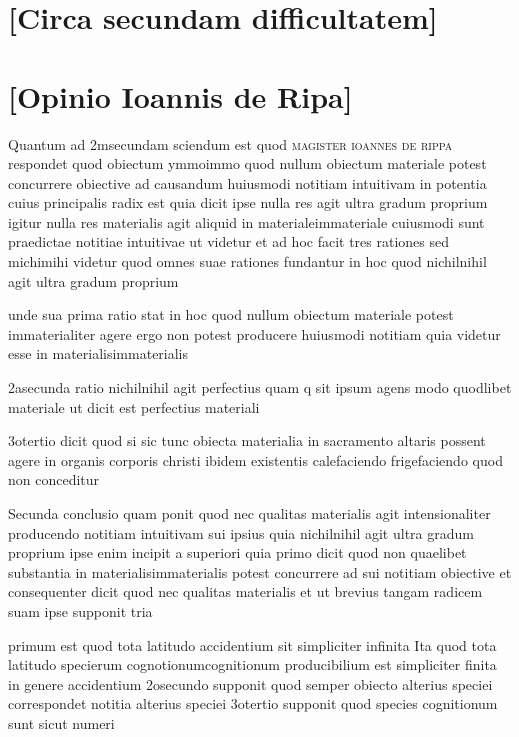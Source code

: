 \documentclass[twoside, openright]{report}
\newcommand{\name}[1]{\textsc{#1}}
\begin{document}
        \bigskip
         \section*{[Circa secundam difficultatem]} 
        \bigskip
         \section*{[Opinio Ioannis de Ripa]} 
        \pstart
        Quantum ad 2msecundam sciendum est quod \name{magister ioannes de rippa} respondet quod obiectum ymmoimmo quod nullum obiectum materiale potest concurrere obiective ad causandum huiusmodi notitiam intuitivam in potentia cuius principalis radix est quia dicit ipse nulla res agit ultra gradum proprium igitur nulla res materialis agit aliquid in materialeimmateriale cuiusmodi sunt praedictae notitiae intuitivae ut videtur et ad hoc facit tres rationes sed michimihi videtur quod omnes suae rationes fundantur in hoc quod nichilnihil agit ultra gradum proprium
        \pend
     
        \pstart
        unde sua prima ratio stat in hoc quod nullum obiectum materiale potest immaterialiter agere ergo non potest producere huiusmodi notitiam quia videtur esse in materialisimmaterialis
        \pend
     
        \pstart
        2asecunda ratio nichilnihil agit perfectius quam q sit ipsum agens modo quodlibet materiale ut dicit est perfectius materiali
        \pend
     
        \pstart
        3otertio dicit quod si sic tunc obiecta materialia in sacramento altaris possent agere in organis corporis christi ibidem existentis calefaciendo frigefaciendo quod non conceditur
        \pend
     
        \pstart
        Secunda conclusio quam ponit quod nec qualitas materialis agit intensionaliter producendo notitiam intuitivam sui ipsius quia nichilnihil agit ultra gradum proprium ipse enim incipit a superiori quia primo dicit quod non quaelibet substantia in materialisimmaterialis potest concurrere ad sui notitiam obiective et consequenter dicit quod nec qualitas materialis et ut brevius tangam radicem suam ipse supponit tria
        \pend
     
        \pstart
        primum est quod tota latitudo accidentium sit simpliciter infinita  Ita quod tota latitudo specierum cognotionumcognitionum producibilium est simpliciter finita in genere accidentium  2osecundo supponit quod semper obiecto alterius speciei correspondet notitia alterius speciei 3otertio supponit quod species cognitionum sunt sicut numeri
        \pend
     
\end{document}
